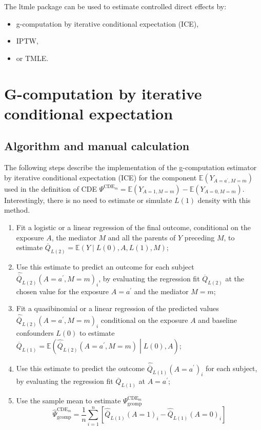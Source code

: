\documentclass[
]{book}
\providecommand{\tightlist}{%
  \setlength{\itemsep}{0pt}\setlength{\parskip}{0pt}}
\begin{document}
The ltmle package can be used to estimate controlled direct effects by:

\begin{itemize}
\tightlist
\item
  g-computation by iterative conditional expectation (ICE),
\item
  IPTW,
\item
  or TMLE.
\end{itemize}

\section{G-computation by iterative conditional expectation}\label{ChapGcomp-CDE-ICE}

\subsection{Algorithm and manual calculation}\label{algorithm-and-manual-calculation}

The following steps describe the implementation of the g-computation estimator by iterative conditional expectation (ICE) for the component \(\mathbb{E}(Y_{A=a^\prime,M=m})\) used in the definition of CDE \(\Psi^{\text{CDE}_m} = \mathbb{E}(Y_{A=1,M=m}) - \mathbb{E}(Y_{A=0,M=m})\). Interestingly, there is no need to estimate or simulate \(L(1)\) density with this method.

\begin{enumerate}
\def\labelenumi{\arabic{enumi}.}
\item
  Fit a logistic or a linear regression of the final outcome, conditional on the exposure \(A\), the mediator \(M\) and all the parents of \(Y\) preceding \(M\), to estimate \(\overline{Q}_{L(2)} = \mathbb{E}(Y \mid L(0),A,L(1),M)\);
\item
  Use this estimate to predict an outcome for each subject \(\hat{\overline{Q}}_{L(2)}(A=a^\prime,M=m)_i\), by evaluating the regression fit \(\overline{Q}_{L(2)}\) at the chosen value for the exposure \(A=a^\prime\) and the mediator \(M=m\);
\item
  Fit a quasibinomial or a linear regression of the predicted values \(\hat{\overline{Q}}_{L(2)}(A=a^\prime,M=m)_i\) conditional on the exposure \(A\) and baseline confounders \(L(0)\) to estimate \(\overline{Q}_{L(1)} = \mathbb{E}\left(\hat{\overline{Q}}_{L(2)}(A=a^\prime,M=m) \middle| L(0),A\right)\);
\item
  Use this estimate to predict the outcome \(\hat{\overline{Q}}_{L(1)}(A=a^\prime)_i\) for each subject, by evaluating the regression fit \(\overline{Q}_{L(1)}\) at \(A=a^\prime\);
\item
  Use the sample mean to estimate \(\Psi^{\text{CDE}_m}_{\text{gcomp}}\)
  \begin{equation}
  \hat{\Psi}^{\text{CDE}_m}_{\text{gcomp}} = \frac{1}{n} \sum_{i=1}^n \left[ \hat{\overline{Q}}_{L(1)}(A=1)_i - \hat{\overline{Q}}_{L(1)}(A=0)_i \right]
  \end{equation}
\end{enumerate}
\end{document}
